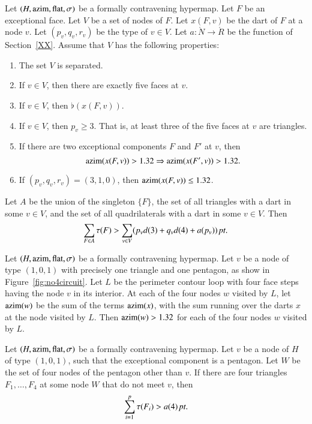 \begin{lemma} \label{lemma:excess-1:bis}
Let $(H,{\operatorname{azim}},\operatorname{flat},\sigma)$ be a formally contravening hypermap.
Let $F$ be an exceptional face.  Let $V$ be a set of nodes of $F$.
Let $x(F,v)$ be the dart of $F$ at a node $v$.  Let $(p_v,q_v,r_v)$
be the type of $v\in V$.   Let $a:\ring{N}\to\ring{R}$ be the
function of Section~\ref{XX}. Assume that $V$ has the following
properties:
    \begin{enumerate}
        \item The set $V$ is separated.
        \item If $v\in V$, then there are exactly five faces at
        $v$.
        \item If $v\in V$, then $\flat(x(F,v))$.
        \item If $v\in V$, then $p_v\ge 3$.  That is, at least
        three of the five faces at $v$ are triangles.
        \item If there are two exceptional components $F$ and $F'$ at
        $v$, then
            $${\operatorname{azim}}(x(F,v)) > 1.32 \Rightarrow {\operatorname{azim}}(x(F',v)) > 1.32.$$
        \item If $(p_v,q_v,r_v)=(3,1,0)$, then ${\operatorname{azim}}(x(F,v))\le 1.32$.
    \end{enumerate}
Let $A$ be the union of the singleton $\{F\}$, the set of all
triangles with a dart in some $v\in V$, and the set of all
quadrilaterals with a dart in some $v\in V$. Then
    $$\sum_{F\in A}\tau(F) > \sum_{v\in V} (p_v d(3) + q_v d(4) + a
    (p_v))\,\hbox{\it pt}.$$
\end{lemma}


\begin{lemma}\label{lemma:nobad4}
Let $(H,{\operatorname{azim}},\operatorname{flat},\sigma)$ be a formally contravening hypermap.
Let $v$ be a node of type $(1,0,1)$ with precisely one triangle and
one pentagon, as show in Figure~\ref{fig:no4circuit}. Let $L$ be
the perimeter contour loop with four face steps having the node $v$
in its interior.  At each of the four nodes $w$ visited by $L$, let
${\operatorname{azim}}(w)$ be the sum of the terms ${\operatorname{azim}}(x)$, with the sum running
over the darts $x$ at the node visited by $L$.  Then
    ${\operatorname{azim}}(w) > 1.32$
for each of the four nodes $w$ visited by $L$.
\end{lemma}

\begin{lemma} Let $(H,{\operatorname{azim}},\operatorname{flat},\sigma)$ be a formally contravening
hypermap.  Let $v$ be a node of $H$ of type $(1,0,1)$, such that the
exceptional component is a pentagon.  Let $W$ be the set of four nodes
of the pentagon other than $v$.  If there are four triangles
$F_1,\ldots,F_4$ at some node $W$ that do not meet $v$, then
    $$\sum_{i=1}^p \tau(F_i) > a(4)\,\hbox{\it pt}.$$
\end{lemma}

